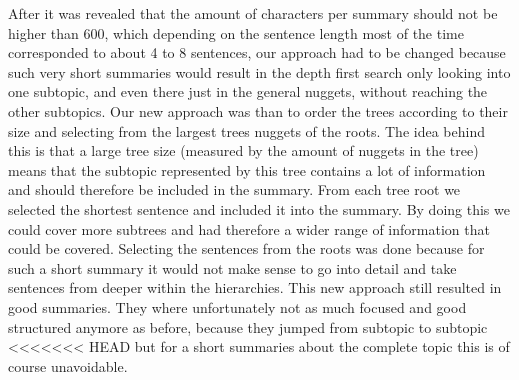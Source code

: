 After it was revealed that the amount of characters per summary should not be
higher than 600, which depending on the sentence length most of the time
corresponded to about 4 to 8 sentences, our approach had to be changed because such very short summaries would result in the depth first search only looking into one subtopic, and even
there just in the general nuggets, without reaching the other subtopics. Our new
approach was than to order the trees according to their size and selecting from
the largest trees nuggets of the roots. The idea behind this is that a large tree
size (measured by the amount of nuggets in the tree) means that the subtopic represented by
this tree contains a lot of information and should therefore be included in the
summary. From each tree root we selected the shortest sentence and included it
into the summary. By doing this we could cover more subtrees and had therefore a
wider range of information that could be covered. Selecting the sentences from
the roots was done because for such a short summary it would not make sense to
go into detail and take sentences from deeper within the hierarchies. This new
approach still resulted in good summaries. They where unfortunately not as much focused and
good structured anymore as before, because they jumped from subtopic to subtopic
<<<<<<< HEAD
but for a short summaries about the complete topic this is of course unavoidable.

